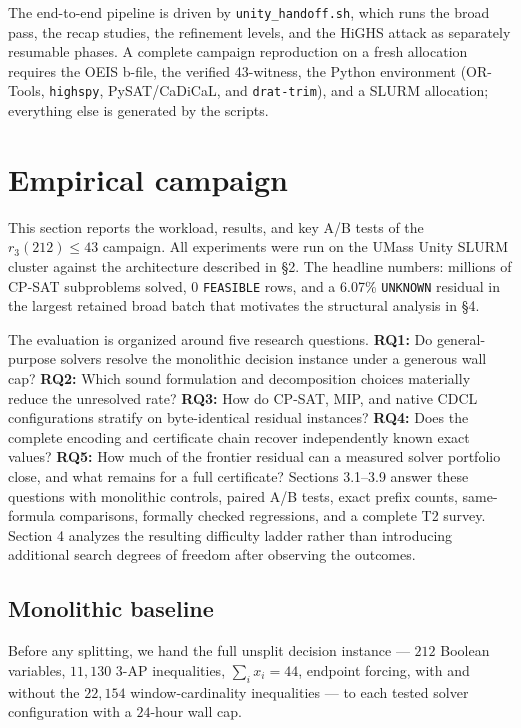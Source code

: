 The end-to-end pipeline is driven by \texttt{unity\_handoff.sh}, which
runs the broad pass, the recap studies, the refinement levels, and
the HiGHS attack as separately resumable phases. A complete
campaign reproduction on a fresh allocation requires the OEIS
b-file, the verified 43-witness, the Python environment
(OR-Tools, \texttt{highspy}, PySAT/CaDiCaL, and \texttt{drat-trim}), and a SLURM allocation;
everything else is
generated by the scripts.

\section{Empirical campaign}\label{empirical-campaign}

This section reports the workload, results, and key A/B tests of the
$r_3(212) \leq 43$ campaign. All experiments were run on the UMass Unity
SLURM cluster against the architecture described in §2. The headline
numbers: millions of CP-SAT subproblems solved, 0 \texttt{FEASIBLE}
rows, and a 6.07\% \texttt{UNKNOWN} residual in the largest retained broad batch that
motivates the structural analysis in §4.

The evaluation is organized around five research questions.  \textbf{RQ1:}
Do general-purpose solvers resolve the monolithic decision instance under a
generous wall cap?  \textbf{RQ2:} Which sound formulation and decomposition
choices materially reduce the unresolved rate?  \textbf{RQ3:} How do CP-SAT,
MIP, and native CDCL configurations stratify on byte-identical residual
instances?  \textbf{RQ4:} Does the complete encoding and certificate chain
recover independently known exact values?  \textbf{RQ5:} How much of the
frontier residual can a measured solver portfolio close, and what remains for
a full certificate?  Sections 3.1--3.9 answer these questions with monolithic
controls, paired A/B tests, exact prefix counts, same-formula comparisons,
formally checked regressions, and a complete T2 survey.  Section 4 analyzes
the resulting difficulty ladder rather than introducing additional search
degrees of freedom after observing the outcomes.

\subsection{Monolithic baseline}\label{monolithic-baseline}

Before any splitting, we hand the full unsplit decision instance ---
$212$ Boolean variables, $11{,}130$ 3-AP inequalities, $\sum_i x_i = 44$,
endpoint forcing, with and without the $22{,}154$ window-cardinality
inequalities --- to each tested solver configuration with a $24$-hour wall cap.


